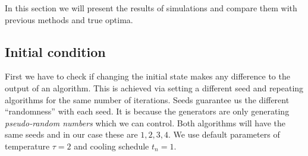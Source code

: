 In this section we will present the results of simulations and compare them with previous methods and true optima.

\subsection{Initial condition}
	First we have to check if changing the initial state makes any difference to the output of an algorithm. This is achieved via setting a different seed and repeating algorithms for the same number of iterations. Seeds guarantee us the different ``randomness'' with each seed. It is because the generators are only generating \textit{pseudo-random numbers} which we can control. Both algorithms will have the same seeds and in our case these are $1,2,3,4$. We use default parameters of temperature $\tau=2$ and cooling schedule $t_n=1$.
